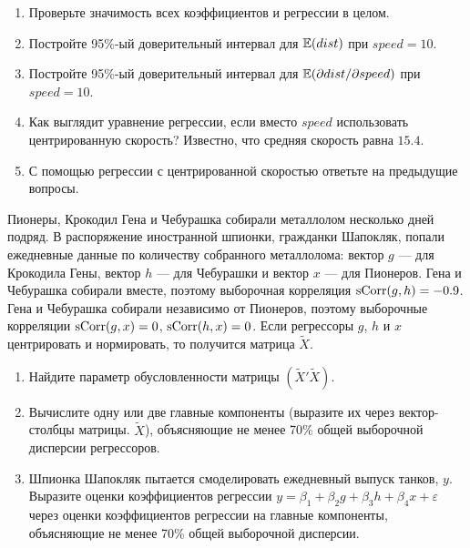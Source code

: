 \begin{problem}
\begin{enumerate}
\item Проверьте значимость всех коэффициентов и регрессии в целом.
\item Постройте 95\%-ый доверительный интервал для $\mathbb{E}(dist)$ при $speed=10$.
\item Постройте 95\%-ый доверительный интервал для $\mathbb{E}(\partial dist/ \partial speed)$ при $speed=10$.
\item Как выглядит уравнение регрессии, если вместо $speed$ использовать центрированную скорость? Известно, что средняя скорость равна $15.4$. 
\item С помощью регрессии с центрированной скоростью ответьте на предыдущие вопросы.
\end{enumerate}

\begin{sol}
\end{sol}
\end{problem}


\begin{problem}
Пионеры, Крокодил Гена и Чебурашка собирали металлолом несколько дней подряд. В распоряжение иностранной шпионки, гражданки Шапокляк, попали ежедневные данные по количеству собранного металлолома: вектор $g$ — для Крокодила Гены, вектор $h$ — для Чебурашки и вектор $x$ — для Пионеров. Гена и Чебурашка собирали вместе, поэтому выборочная корреляция $\operatorname{sCorr}(g,h)=-0.9$. Гена и Чебурашка собирали независимо от Пионеров, поэтому выборочные корреляции $\operatorname{sCorr}(g,x)=0$, $\operatorname{sCorr}(h,x)=0$. Если регрессоры $g$, $h$ и $x$ центрировать и нормировать, то получится матрица $\tilde{X}$.
\begin{enumerate}
\item Найдите параметр обусловленности матрицы $(\tilde{X}'\tilde{X})$.
\item Вычислите одну или две главные компоненты (выразите их через вектор-столбцы матрицы. $\tilde{X}$), объясняющие не менее 70\% общей выборочной дисперсии регрессоров.
\item Шпионка Шапокляк пытается смоделировать ежедневный выпуск танков, $y$. Выразите оценки коэффициентов регрессии $y = \beta_1 + \beta_2 g +\beta_3 h +\beta_4 x+\varepsilon$ через оценки коэффициентов регрессии на главные компоненты, объясняющие не менее 70\% общей выборочной дисперсии.
\end{enumerate}

\begin{sol}
\end{sol}
\end{problem}




